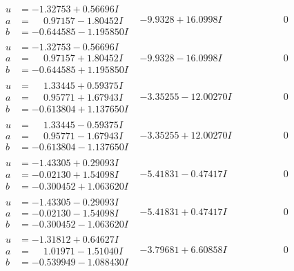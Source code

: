 \documentclass[1p]{elsarticle_modified}
\theoremstyle{definition}
\begin{document}
$$\begin{array}{c|c|c}
\begin{aligned}
u &= -1.32753 + 0.56696 I \\
a &= \phantom{-}0.97157 - 1.80452 I \\
b &= -0.644585 - 1.195850 I\end{aligned}
 & -9.9328 + 16.0998 I & \phantom{-0.000000 } 0 \\ \hline\begin{aligned}
u &= -1.32753 - 0.56696 I \\
a &= \phantom{-}0.97157 + 1.80452 I \\
b &= -0.644585 + 1.195850 I\end{aligned}
 & -9.9328 - 16.0998 I & \phantom{-0.000000 } 0 \\ \hline\begin{aligned}
u &= \phantom{-}1.33445 + 0.59375 I \\
a &= \phantom{-}0.95771 + 1.67943 I \\
b &= -0.613804 + 1.137650 I\end{aligned}
 & -3.35255 - 12.00270 I & \phantom{-0.000000 } 0 \\ \hline\begin{aligned}
u &= \phantom{-}1.33445 - 0.59375 I \\
a &= \phantom{-}0.95771 - 1.67943 I \\
b &= -0.613804 - 1.137650 I\end{aligned}
 & -3.35255 + 12.00270 I & \phantom{-0.000000 } 0 \\ \hline\begin{aligned}
u &= -1.43305 + 0.29093 I \\
a &= -0.02130 + 1.54098 I \\
b &= -0.300452 + 1.063620 I\end{aligned}
 & -5.41831 - 0.47417 I & \phantom{-0.000000 } 0 \\ \hline\begin{aligned}
u &= -1.43305 - 0.29093 I \\
a &= -0.02130 - 1.54098 I \\
b &= -0.300452 - 1.063620 I\end{aligned}
 & -5.41831 + 0.47417 I & \phantom{-0.000000 } 0 \\ \hline\begin{aligned}
u &= -1.31812 + 0.64627 I \\
a &= \phantom{-}1.01971 - 1.51040 I \\
b &= -0.539949 - 1.088430 I\end{aligned}
 & -3.79681 + 6.60858 I & \phantom{-0.000000 } 0 \\ \hline\begin{aligned}

\end{aligned}
\end{array}$$
\end{document}
